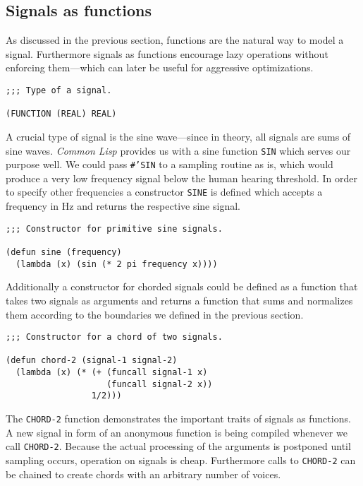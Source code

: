 \subsection{Signals as functions}

As discussed in the previous section, functions are the natural way
to model a signal. Furthermore signals as functions encourage lazy
operations without enforcing them---which can later be useful for
aggressive optimizations.

\begin{verbatim}
;;; Type of a signal.

(FUNCTION (REAL) REAL)
\end{verbatim}

A crucial type of signal is the sine wave---since in theory, all
signals are sums of sine waves. \textit{Common Lisp} provides us with a
sine function \texttt{SIN} which serves our purpose well. We could pass
\texttt{\#'SIN} to a sampling routine as is, which would produce a very
low frequency signal below the human hearing threshold. In order to
specify other frequencies a constructor \texttt{SINE} is defined which
accepts a frequency in Hz and returns the respective sine signal.

\begin{verbatim}
;;; Constructor for primitive sine signals.

(defun sine (frequency)
  (lambda (x) (sin (* 2 pi frequency x))))
\end{verbatim}

Additionally a constructor for chorded signals could be defined as a
function that takes two signals as arguments and returns a function that
sums and normalizes them according to the boundaries we defined in the
previous section.

\begin{verbatim}
;;; Constructor for a chord of two signals.

(defun chord-2 (signal-1 signal-2)
  (lambda (x) (* (+ (funcall signal-1 x)
                    (funcall signal-2 x))
                 1/2)))
\end{verbatim}

The \texttt{CHORD-2} function demonstrates the important traits of
signals as functions. A new signal in form of an anonymous function is
being compiled whenever we call \texttt{CHORD-2}. Because the actual
processing of the arguments is postponed until sampling occurs,
operation on signals is cheap. Furthermore calls to \texttt{CHORD-2}
can be chained to create chords with an arbitrary number of voices.

